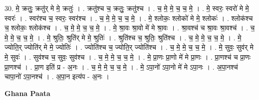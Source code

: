 \documentclass[17pt]{extarticle}
\begin{document}
30. मे॒ क्रतुः॒ क्रतु॑र् मे मे॒ क्रतुः॑ । . क्रतु॑श्च च॒ क्रतुः॒ क्रतु॑श्च । . च॒ मे॒ मे॒ च॒ च॒ मे॒ । . मे॒ स्वरः॒ स्वरो॑ मे मे॒ स्वरः॑ । . स्वर॑श्च च॒ स्वरः॒ स्वर॑श्च । . च॒ मे॒ मे॒ च॒ च॒ मे॒ । . मे॒ श्लोकः॒ श्लोको॑ मे मे॒ श्लोकः॑ । . श्लोक॑श्च च॒ श्लोकः॒ श्लोक॑श्च । . च॒ मे॒ मे॒ च॒ च॒ मे॒ । . मे॒ श्रा॒वः श्रा॒वो मे॑ मे श्रा॒वः । . श्रा॒वश्च॑ च श्रा॒वः श्रा॒वश्च॑ । . च॒ मे॒ मे॒ च॒ च॒ मे॒ । . मे॒ श्रुतिः॒ श्रुति॑र् मे मे॒ श्रुतिः॑ । . श्रुति॑श्च च॒ श्रुतिः॒ श्रुति॑श्च । . च॒ मे॒ मे॒ च॒ च॒ मे॒ । . मे॒ ज्योति॒र् ज्योति॑र् मे मे॒ ज्योतिः॑ । . ज्योति॑श्च च॒ ज्योति॒र् ज्योति॑श्च । . च॒ मे॒ मे॒ च॒ च॒ मे॒ । . मे॒ सुवः॒ सुव॑र् मे मे॒ सुवः॑ । . सुव॑श्च च॒ सुवः॒ सुव॑श्च । . च॒ मे॒ मे॒ च॒ च॒ मे॒ । . मे॒ प्रा॒णः प्रा॒णो मे॑ मे प्रा॒णः । . प्रा॒णश्च॑ च प्रा॒णः प्रा॒णश्च॑ । . प्रा॒ण इति॑ प्र - अ॒नः । . च॒ मे॒ मे॒ च॒ च॒ मे॒ । . मे॒ ऽपा॒नो॑ ऽपा॒नो मे॑ मे ऽपा॒नः । . अ॒पा॒नश्च॑ चापा॒नो॑ ऽपा॒नश्च॑ । . अ॒पा॒न इत्य॑प - अ॒नः । \newline

\textbf{Ghana Paata } \newline
\end{document}
